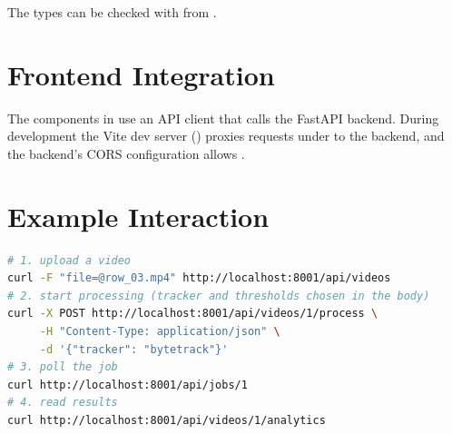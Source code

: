 The types can be checked with  from .

\section{Frontend Integration}

The components in  use an API client that calls the FastAPI backend. During development the Vite dev server () proxies requests under  to the backend, and the backend's CORS configuration allows . 

\section{Example Interaction}


\begin{lstlisting}[style=added,language=bash]
# 1. upload a video
curl -F "file=@row_03.mp4" http://localhost:8001/api/videos
# 2. start processing (tracker and thresholds chosen in the body)
curl -X POST http://localhost:8001/api/videos/1/process \
     -H "Content-Type: application/json" \
     -d '{"tracker": "bytetrack"}'
# 3. poll the job
curl http://localhost:8001/api/jobs/1
# 4. read results
curl http://localhost:8001/api/videos/1/analytics
\end{lstlisting}

